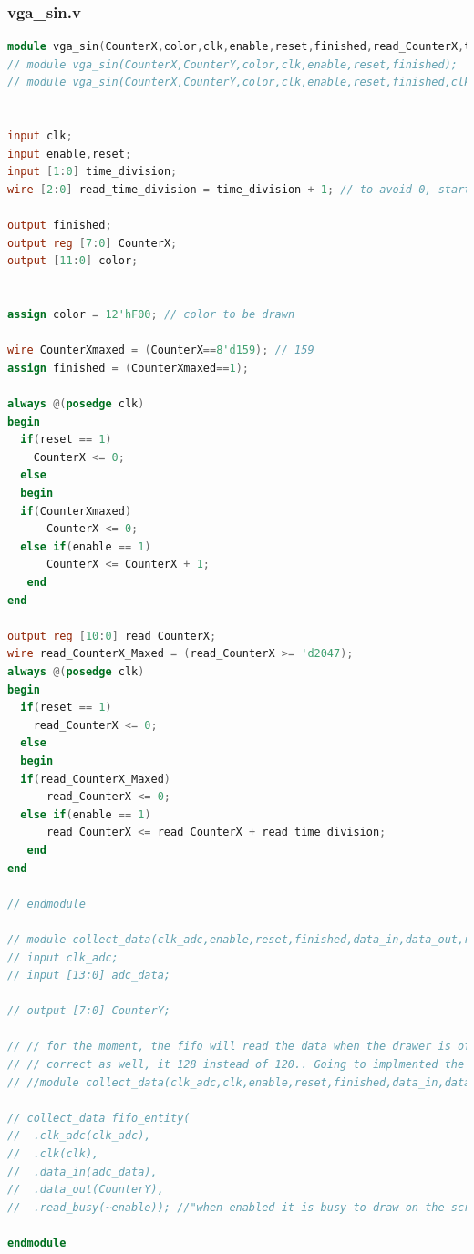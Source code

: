 \documentclass[11pt]{scrartcl}
\begin{document}
\subsubsection{vga\_sin.v}
\begin{lstlisting}[language=Verilog]
module vga_sin(CounterX,color,clk,enable,reset,finished,read_CounterX,time_division);
// module vga_sin(CounterX,CounterY,color,clk,enable,reset,finished);
// module vga_sin(CounterX,CounterY,color,clk,enable,reset,finished,clk_adc,adc_data);


input clk;
input enable,reset;
input [1:0] time_division;
wire [2:0] read_time_division = time_division + 1; // to avoid 0, start from 1

output finished;
output reg [7:0] CounterX;
output [11:0] color;

 
assign color = 12'hF00; // color to be drawn

wire CounterXmaxed = (CounterX==8'd159); // 159
assign finished = (CounterXmaxed==1);

always @(posedge clk)
begin
  if(reset == 1)
    CounterX <= 0;
  else
  begin
  if(CounterXmaxed)
      CounterX <= 0;
  else if(enable == 1)
      CounterX <= CounterX + 1;
   end
end

output reg [10:0] read_CounterX;
wire read_CounterX_Maxed = (read_CounterX >= 'd2047);
always @(posedge clk)
begin
  if(reset == 1)
    read_CounterX <= 0;
  else
  begin
  if(read_CounterX_Maxed)
      read_CounterX <= 0;
  else if(enable == 1)
      read_CounterX <= read_CounterX + read_time_division;
   end
end

// endmodule

// module collect_data(clk_adc,enable,reset,finished,data_in,data_out,read_busy);
// input clk_adc;
// input [13:0] adc_data;

// output [7:0] CounterY;

// // for the moment, the fifo will read the data when the drawer is off continously until full. The word length is not
// // correct as well, it 128 instead of 120.. Going to implmented the trigger after testing the adc
// //module collect_data(clk_adc,clk,enable,reset,finished,data_in,data_out,read_busy);

// collect_data fifo_entity(
//  .clk_adc(clk_adc),
//  .clk(clk),
//  .data_in(adc_data),
//  .data_out(CounterY), 
//  .read_busy(~enable)); //"when enabled it is busy to draw on the screen, usually, enable is the opposite of reset and finifhsed
  
endmodule

\end{lstlisting}
\end{document}
